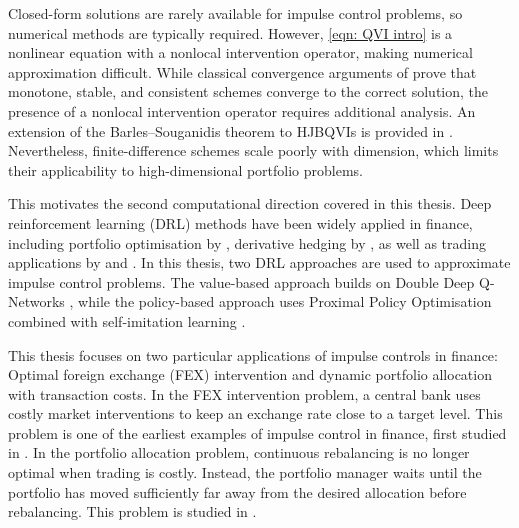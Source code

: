 Closed-form solutions are rarely available for impulse control problems, so numerical methods are typically required. However, \eqref{eqn: QVI intro} is a nonlinear equation with a nonlocal intervention operator, making numerical approximation difficult. While classical convergence arguments of \textcite{barlessouganidis1991convergence} prove that monotone, stable, and consistent schemes converge to the correct solution, the presence of a nonlocal intervention operator requires additional analysis. An extension of the Barles--Souganidis theorem to HJBQVIs is provided in \cite{azimzadeh2018impulsecontrolfinancenumerical,azimzadeh2018convergence,azimzadeh2016weakly}. Nevertheless, finite-difference schemes scale poorly with dimension, which limits their applicability to high-dimensional portfolio problems.

This motivates the second computational direction covered in this thesis. Deep reinforcement learning (DRL) methods have been widely applied in finance, including portfolio optimisation by \textcite{JXL17}, derivative hedging by \textcite{buehler2019deep, buehler2022deep}, as well as trading applications by \textcite{jain2025impulse} and \textcite{anchuri2026rammstein}. In this thesis, two DRL approaches are used to approximate impulse control problems. The value-based approach builds on Double Deep Q-Networks \cite{hasselt2010double, van2016deep}, while the policy-based approach uses Proximal Policy Optimisation \cite{schulman2017proximal} combined with self-imitation learning \cite{oh2018self}.

This thesis focuses on two particular applications of impulse controls in finance: Optimal foreign exchange (FEX) intervention and dynamic portfolio allocation with transaction costs. In the FEX intervention problem, a central bank uses costly market interventions to keep an exchange rate close to a target level. This problem is one of the earliest examples of impulse control in finance, first studied in \cite{mundaca1998optimal, cadenillas1999optimal, cadenillas2000classical}. In the portfolio allocation problem, continuous rebalancing is no longer optimal when trading is costly. Instead, the portfolio manager waits until the portfolio has moved sufficiently far away from the desired allocation before rebalancing. This problem is studied in \cite{EH88, MP95, K98}. 

